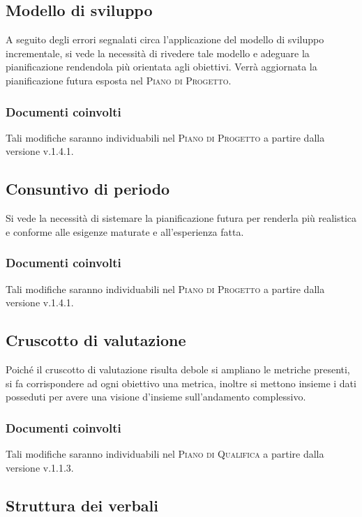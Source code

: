 \documentclass{article}
\begin{document}
\subsection{Modello di sviluppo}
\label{itm:2}

A seguito degli errori segnalati circa l'applicazione del modello di sviluppo incrementale, si vede la necessità di rivedere tale modello e adeguare la pianificazione rendendola
più orientata agli obiettivi. Verrà aggiornata la pianificazione futura esposta nel \textsc{Piano di Progetto}.
\subsubsection*{Documenti coinvolti}
Tali modifiche saranno individuabili nel \textsc{Piano di Progetto} a partire dalla versione v.1.4.1.

\subsection{Consuntivo di periodo}
\label{itm:3}

Si vede la necessità di sistemare la pianificazione futura per renderla più realistica e conforme alle esigenze maturate e all’esperienza fatta.
\subsubsection*{Documenti coinvolti}
Tali modifiche saranno individuabili nel \textsc{Piano di Progetto} a partire dalla versione v.1.4.1.

\subsection{Cruscotto di valutazione}
\label{itm:4}

Poiché il cruscotto di valutazione risulta debole si ampliano le metriche presenti, si fa corrispondere ad ogni obiettivo una metrica, inoltre
si mettono insieme i dati posseduti per avere una visione d’insieme sull’andamento complessivo.
\subsubsection*{Documenti coinvolti}
Tali modifiche saranno individuabili nel \textsc{Piano di Qualifica} a partire dalla versione v.1.1.3.

\subsection{Struttura dei verbali}
\label{itm:5}
\end{document}
